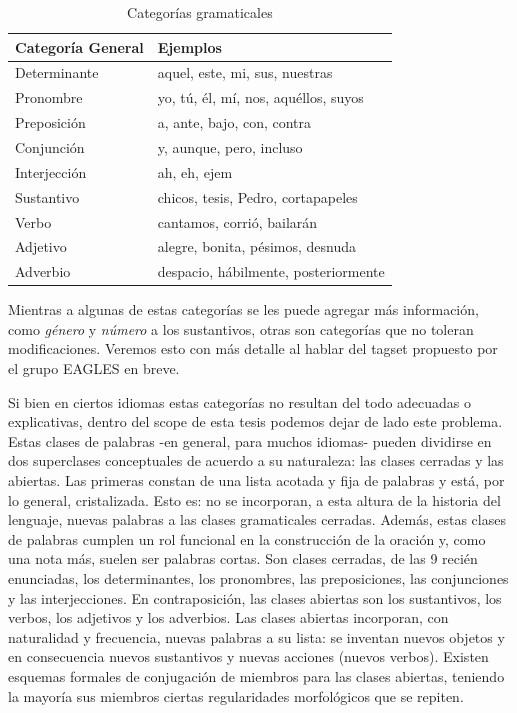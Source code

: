 \begin{center}
\begin{table}
\centering
\begin{tabular}{| l | l |}
 \hline
Categoría General & Ejemplos \\ \hline
Determinante & aquel, este, mi, sus, nuestras \\ \hline
Pronombre & yo, tú, él, mí, nos, aquéllos, suyos \\ \hline
Preposición & a, ante, bajo, con, contra\\ \hline
Conjunción & y, aunque, pero, incluso\\ \hline
Interjección & ah, eh, ejem\\ \hline
Sustantivo & chicos, tesis, Pedro, cortapapeles\\ \hline
Verbo & cantamos, corrió, bailarán\\ \hline
Adjetivo & alegre, bonita, pésimos, desnuda\\ \hline
Adverbio & despacio, hábilmente, posteriormente\\ \hline
\end{tabular}
\caption{Categorías gramaticales}
\label{table:categorias-gramaticales}
\end{table}
\end{center}

Mientras a algunas de estas categorías se les puede agregar más información, como \textit{género} y \textit{número} a los sustantivos, otras son categorías que no toleran modificaciones. Veremos esto con más detalle al hablar del tagset propuesto por el grupo EAGLES en breve.

Si bien en ciertos idiomas estas categorías no resultan del todo adecuadas o explicativas, dentro del scope de esta tesis podemos dejar de lado este problema.
Estas clases de palabras -en general, para muchos idiomas- pueden dividirse en dos superclases conceptuales de acuerdo a su naturaleza: las clases cerradas y las abiertas. Las primeras constan de una lista acotada y fija de palabras y está, por lo general, cristalizada. Esto es: no se incorporan, a esta altura de la historia del lenguaje, nuevas palabras a las clases gramaticales cerradas. Además, estas clases de palabras cumplen un rol funcional en la construcción de la oración y, como una nota más, suelen ser palabras cortas. Son clases cerradas, de las 9 recién enunciadas, los determinantes, los pronombres, las preposiciones, las conjunciones y las interjecciones. En contraposición, las clases abiertas son los sustantivos, los verbos, los adjetivos y los adverbios. Las clases abiertas incorporan, con naturalidad y frecuencia, nuevas palabras a su lista: se inventan nuevos objetos y en consecuencia nuevos sustantivos y nuevas acciones (nuevos verbos). Existen esquemas formales de conjugación de miembros para las clases abiertas, teniendo la mayoría sus miembros ciertas regularidades morfológicos que se repiten.

